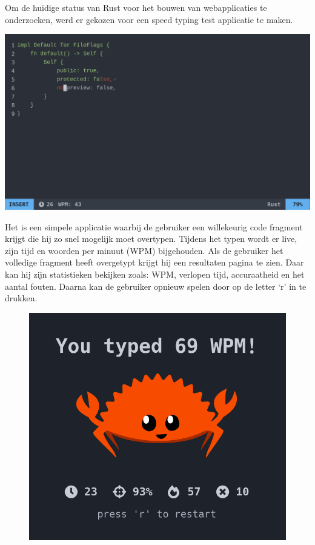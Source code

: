 Om de huidige status van Rust voor het bouwen van webapplicaties te onderzoeken, werd er gekozen
voor een speed typing test applicatie te maken.

\includegraphics[width=\textwidth]{./figures/vim.png}

Het is een simpele applicatie waarbij de gebruiker een willekeurig code fragment krijgt die hij zo
snel mogelijk moet overtypen. Tijdens het typen wordt er live, zijn tijd en woorden per minuut (WPM)
bijgehouden. Als de gebruiker het volledige fragment heeft overgetypt krijgt hij een resultaten
pagina te zien. Daar kan hij zijn statistieken bekijken zoals: WPM, verlopen tijd, accuraatheid en
het aantal fouten. Daarna kan de gebruiker opnieuw spelen door op de letter ‘r’ in te drukken. \\
\begin{figure}
  \centering
  \includegraphics[width=0.9\linewidth]{./figures/result.png}
\end{figure}


